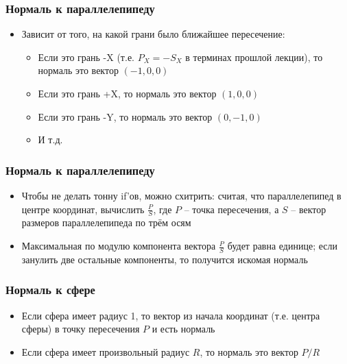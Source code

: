 \documentclass[10pt]{beamer}
\begin{document}
\begin{frame}[fragile]
\frametitle{Нормаль к параллелепипеду}
\begin{itemize}
\item Зависит от того, на какой грани было ближайшее пересечение:
\pause
\begin{itemize}
\item Если это грань -X (т.е. \begin{math}P_X = -S_X\end{math} в терминах прошлой лекции), то нормаль это вектор \begin{math}(-1, 0, 0)\end{math}
\item Если это грань +X, то нормаль это вектор \begin{math}(1, 0, 0)\end{math}
\item Если это грань -Y, то нормаль это вектор \begin{math}(0, -1, 0)\end{math}
\item И т.д.
\end{itemize}
\end{itemize}
\end{frame}

\begin{frame}[fragile]
\frametitle{Нормаль к параллелепипеду}
\begin{itemize}
\item Чтобы не делать тонну if'ов, можно схитрить: считая, что параллелепипед в центре координат, вычислить \begin{math}\frac{P}{S}\end{math}, где \begin{math}P\end{math} -- точка пересечения, а \begin{math}S\end{math} -- вектор размеров параллелепипеда по трём осям
\pause
\item Максимальная по модулю компонента вектора \begin{math}\frac{P}{S}\end{math} будет равна единице; если занулить две остальные компоненты, то получится искомая нормаль
\end{itemize}
\end{frame}

\begin{frame}[fragile]
\frametitle{Нормаль к сфере}
\begin{itemize}
\item Если сфера имеет радиус 1, то вектор из начала координат (т.е. центра сферы) в точку пересечения \begin{math}P\end{math} и есть нормаль
\pause
\item Если сфера имеет произвольный радиус \begin{math}R\end{math}, то нормаль это вектор \begin{math}P/R\end{math}
\end{itemize}
\end{frame}
\end{document}
